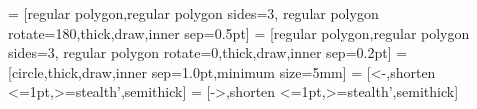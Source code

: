 
\centering
{} = [regular polygon,regular polygon sides=3,
    regular polygon rotate=180,thick,draw,inner sep=0.5pt]
 = [regular polygon,regular polygon sides=3,
    regular polygon rotate=0,thick,draw,inner sep=0.2pt]
 = [circle,thick,draw,inner sep=1.0pt,minimum size=5mm]
 = [<-,shorten <=1pt,>=stealth',semithick]
 = [->,shorten <=1pt,>=stealth',semithick]
\footnotesize
{}
